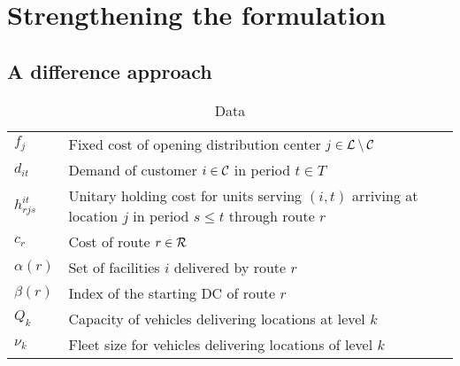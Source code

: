 \section{Strengthening the formulation}
\subsection{A difference approach}
\begin{table}[htbp]
\centering
\begin{tabular}{ll}
\toprule
$f_j$ & Fixed cost of opening distribution center $j\in\mathcal{L} \setminus \mathcal{C}$\\ 
$d_{it}$ & Demand of customer $i\in\mathcal{C}$ in period $t \in T$\\
$h^{it}_{rjs}$ & Unitary holding cost for units serving $(i,t)$ arriving at location $j$ in period $s\leq t$ through route $r$\\
        $c_r$ & Cost of route $r\in \mathcal{R}$\\
        $\alpha(r)$ & Set of facilities $i$ delivered by route $r$\\
        $\beta(r)$ & Index of the starting DC of route $r$\\
        $Q_k$ & Capacity of vehicles delivering locations at level $k$\\ 
        $\nu_k$ & Fleet size for vehicles delivering locations of level $k$\\ 
        \bottomrule
        \end{tabular}
        \caption{Data}
        \label{tab:data2}
        \end{table}       

